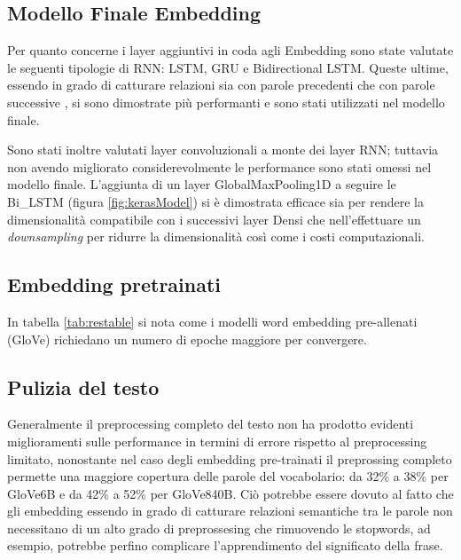
\subsection{Modello Finale Embedding}

Per quanto concerne i layer aggiuntivi in coda agli Embedding sono state
valutate le seguenti tipologie di RNN: LSTM, GRU e Bidirectional LSTM. Queste
ultime, essendo in grado di catturare relazioni sia con parole precedenti che
con parole successive \cite{schuster1997bidirectional}, si sono dimostrate più
performanti e sono stati utilizzati nel modello finale.

Sono stati inoltre valutati layer convoluzionali a monte dei layer RNN; tuttavia
non avendo migliorato considerevolmente le performance sono stati omessi nel
modello finale.
L'aggiunta di un layer GlobalMaxPooling1D a seguire le
Bi\_LSTM (figura \ref{fig:kerasModel}) si è dimostrata efficace sia per rendere
la dimensionalità compatibile con i successivi layer Densi che nell'effettuare
un \textit{downsampling} per ridurre la dimensionalità così come i
costi computazionali.

\subsection{Embedding pretrainati}
In tabella \ref{tab:restable} si nota come i modelli word embedding
pre-allenati (GloVe) richiedano un numero di epoche maggiore per convergere.

\subsection{Pulizia del testo}

Generalmente il preprocessing completo del testo non ha prodotto evidenti
miglioramenti sulle performance in termini di errore rispetto al preprocessing
limitato, nonostante nel caso degli embedding pre-trainati il preprossing
completo permette una maggiore copertura delle parole del vocabolario: da 32\%
a 38\% per GloVe6B e da 42\% a 52\% per GloVe840B.
Ciò potrebbe essere dovuto al fatto che gli
embedding essendo in grado di catturare relazioni semantiche tra le parole non
necessitano di un alto grado di preprossesing che rimuovendo le stopwords, ad
esempio, potrebbe perfino complicare l'apprendimento del significato della
frase.

